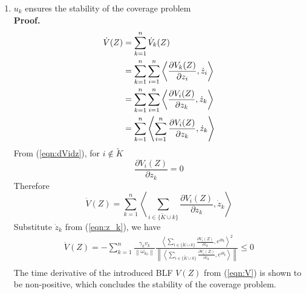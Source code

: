 \documentclass[journal]{IEEEtran}
\newcommand{\norm}[1]{\left\lVert#1\right\rVert}
\begin{document}
\begin{enumerate} [leftmargin=*]
		\item $ u_k $ ensures the stability of the coverage problem \\
		\textbf{Proof.}	\\
		\begin{equation} \notag
		\begin{split}
		\dot V(Z) & =  \sum^{n}_{k=1} \dot V_k(Z) \\
		& = \sum^{n}_{k=1} \sum^{n}_{i=1} \left< \frac{\partial  V_k(Z)}{\partial z_i}, \dot z_i \right > \\
		& = \sum^{n}_{k=1} \sum^{n}_{i=1} \left< \frac{\partial  V_i(Z)}{\partial z_k}, \dot z_k \right > \\
		& = \sum^{n}_{k=1} \left< \sum^{n}_{i=1} \frac{\partial V_i(Z)}{\partial z_k} , \dot z_k \right > \\
		\end{split}
		\end{equation}
		From (\ref{eqn:dVidz}), for $i \notin \tilde{K}$
		\[\frac{\partial  V_i(Z)}{\partial z_k} = 0\]
		Therefore 
		\[\dot V(Z) = \sum^{n}_{k=1} \left< \sum\limits_{i \in \{\tilde{K} \cup k\}} \frac{\partial V_i(Z)}{\partial z_k} , \dot z_k \right >\]
		Substitute $\dot z_k$ from (\ref{eqn:z_k}), we have
		\begin{equation} \label{eqn:V_dot}
		\begin{split}
		\dot V(Z) = - \sum^{n}_{k=1} 			\frac{\gamma_k v_k}{\norm{\omega_{k_0}}} 		\frac{\left<\sum\limits_{i \in \{\tilde{K} \cup k\}} \frac{\partial V_i(Z)}{\partial z_k}, e^{i\theta_{k}} \right >^2}   	 {\norm{\left <\sum\limits_{i \in \{\tilde{K} \cup k\}}\frac{\partial V_i(Z)}{\partial z_k}, e^{i\theta_k} \right >}} \leq 0\\ 
		\end{split}
		\end{equation}
		\noindent The time derivative of the introduced BLF $V(Z)$ from (\ref{eqn:V}) is shown to be non-positive, which concludes the stability of the coverage problem. 
	\end{enumerate}
\end{document}
